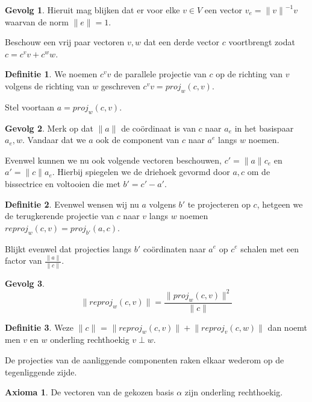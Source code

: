 \documentclass{amsart}
\theoremstyle{definition}
\newtheorem{axm}{Axioma}[section]
\newtheorem{dfn}{Definitie}[section]
\newtheorem{csq}{Gevolg}[section]
\newcommand{\norm}[1]{\lVert#1\rVert}
\begin{document}
\begin{csq}
	Hieruit mag blijken dat er voor elke $v \in V$ een vector $v_e = {\norm v}^{-1}v$ waarvan de norm $\norm e = 1$.
\end{csq}

Beschouw een vrij paar vectoren $v, w$ dat een derde vector $c$ voortbrengt zodat $c = c^v v + c^w w$.

\begin{dfn}
	We noemen $c^v v$ de parallele projectie van $c$ op de richting van $v$ volgens de richting van $w$ geschreven $c^v v = proj_{w}(c, v)$.
\end{dfn}

Stel voortaan $a = proj_w(c, v)$.

\begin{csq}
	Merk op dat $\norm a$ de coördinaat is van $c$ naar $a_e$ in het basispaar $a_e, w$.
	Vandaar dat we $a$ ook de component van $c$ naar $a^e$ langs $w$ noemen.
\end{csq}


Evenwel kunnen we nu ook volgende vectoren beschouwen, $c' = \norm a c_e$ en $a' = \norm c a_e$.
Hierbij spiegelen we de driehoek gevormd door $a, c$ om de bissectrice en voltooien die met $b' = c' - a'$.

\begin{dfn}
	Evenwel wensen wij nu $a$ volgens $b'$ te projecteren op $c$, hetgeen we de terugkerende projectie van $c$ naar $v$ langs $w$ noemen $reproj_w(c, v) = proj_{b'}(a, c)$.
\end{dfn}

Blijkt evenwel dat projecties langs $b'$ coördinaten naar $a^e$ op $c^e$ schalen met een factor van $\frac{\norm a}{\norm c}$.

\begin{csq}
	\begin{equation*}
		\norm{reproj_w(c, v)} = \frac{\norm{proj_w(c, v)}^2}{\norm c}
	\end{equation*}
\end{csq}

\begin{dfn}
	Weze $\norm c$ = $\norm{reproj_w(c, v)} + \norm{reproj_v(c, w)}$ dan noemt men $v$ en $w$ onderling rechthoekig $v \perp w$.
\end{dfn}

De projecties van de aanliggende componenten raken elkaar wederom op de tegenliggende zijde.

\begin{axm}
	De vectoren van de gekozen basis $\alpha$ zijn onderling rechthoekig.
\end{axm}
\end{document}
